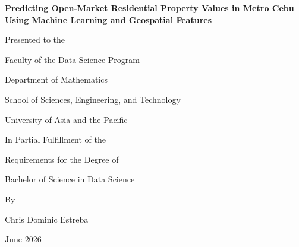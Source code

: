 \thispagestyle{empty}
{}
{\linespread{1}\selectfont
\begin{center}
\vspace*{1.0in}

{\bfseries Predicting Open-Market Residential Property Values in Metro Cebu Using Machine Learning and Geospatial Features\par}

\vspace{1.25in}

Presented to the

\vspace{0.25in}

Faculty of the Data Science Program

Department of Mathematics

School of Sciences, Engineering, and Technology

University of Asia and the Pacific

\vspace{0.75in}

In Partial Fulfillment of the

Requirements for the Degree of

Bachelor of Science in Data Science

\vspace{0.9in}

By

\vspace{0.25in}

Chris Dominic Estreba

\vspace{0.75in}

June 2026
\end{center}
\par}
\clearpage
